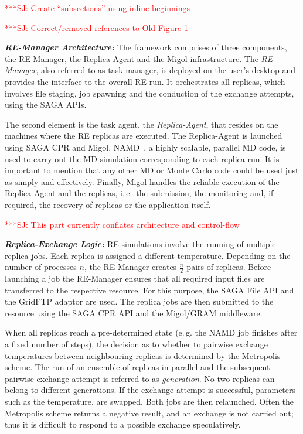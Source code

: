 \documentclass{rspublic}
\newcommand{\jhanote}[1]{ {\textcolor{red} { ***SJ: #1 }}}
\newcommand{\jhanote}[1]{}
\newcommand{\replicaagent}[1]{Replica-Agent }
\newcommand{\remanager}[1]{RE-Manager }
\begin{document}
\jhanote{Create ``subsections'' using inline beginnings}

\jhanote{Correct/removed references to Old Figure 1}

{\it \bf RE-Manager Architecture:} The
framework comprises of three components, the RE-Man\-ag\-er,
the Replica-Agent and the Migol infrastructure. 
The  \emph{RE-Manager}, also referred to as task manager,
is deployed on the user's desktop and provides the interface 
to the overall RE run. It orchestrates all replicas, which involves
file staging, job spawning and the conduction of the 
exchange attempts, using the SAGA APIs.                                                                

The second element is the task agent, the \textit{Replica-Agent},
that resides on the machines where the RE replicas
are executed. The \replicaagent\ is launched using SAGA CPR and Migol.
NAMD~\citep{Phillips:2005gd}, a highly scalable, parallel MD code, is
used to carry out the MD simulation corresponding to each replica
run. It is important to mention that any other MD or
Monte Carlo code could be used just as simply and effectively.
Finally, Migol handles the reliable execution of the Replica-Agent and
the replicas, i.\,e.\ the submission, the monitoring and, 
if required, the recovery of replicas or the application itself.




\jhanote{This part currently conflates architecture and control-flow}
                       
\noindent                                            
{\it \bf Replica-Exchange Logic:} RE simulations involve the running 
of multiple replica jobs.
Each replica is assigned a different temperature.  Depending on the number of
processes $n$, the \remanager\ creates $\frac{n}{2}$ pairs
of replicas.  Before launching a job the \remanager\ ensures that all
required input files are transferred to the respective resource. For
this purpose, the SAGA File API and the GridFTP adaptor are used.  
The replica jobs are then submitted to the resource using the SAGA CPR API and
the Migol/GRAM middleware. 

When all replicas reach a pre-determined state (e.\,g. the NAMD job
finishes after a fixed number of steps), the decision as to whether to
pairwise exchange temperatures between neighbouring replicas is
determined by the Metropolis scheme. %
The run of an ensemble of replicas
in parallel and the subsequent pairwise exchange attempt 
is referred to as \emph{generation}. No two replicas can belong to
different generations.  If the exchange attempt is successful, parameters such as the
temperature, are swapped. Both jobs are then relaunched. 
Often the Metropolis scheme returns a
negative result, and an exchange is not carried out; thus it is
difficult to respond to a possible exchange speculatively.
\end{document}
